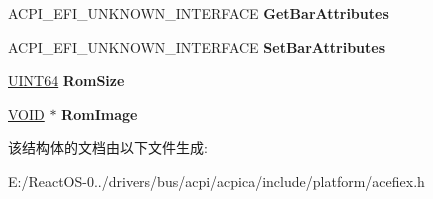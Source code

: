 \begin{DoxyCompactItemize}
A\+C\+P\+I\+\_\+\+E\+F\+I\+\_\+\+U\+N\+K\+N\+O\+W\+N\+\_\+\+I\+N\+T\+E\+R\+F\+A\+CE {\bfseries Get\+Bar\+Attributes}
\item 
\mbox{\label{struct___a_c_p_i___e_f_i___p_c_i___i_o_aa460ced7da34ada58f87001ed3e834d2}} 
A\+C\+P\+I\+\_\+\+E\+F\+I\+\_\+\+U\+N\+K\+N\+O\+W\+N\+\_\+\+I\+N\+T\+E\+R\+F\+A\+CE {\bfseries Set\+Bar\+Attributes}
\item 
\mbox{\label{struct___a_c_p_i___e_f_i___p_c_i___i_o_aa56a07c3a65ca96e4116108529f0ddb9}} 
\hyperlink{_processor_bind_8h_a57be03562867144161c1bfee95ca8f7c}{U\+I\+N\+T64} {\bfseries Rom\+Size}
\item 
\mbox{\label{struct___a_c_p_i___e_f_i___p_c_i___i_o_a1dc0cfd2e73506f5e5153c00256f4792}} 
\hyperlink{interfacevoid}{V\+O\+ID} $\ast$ {\bfseries Rom\+Image}
\end{DoxyCompactItemize}


该结构体的文档由以下文件生成\+:\begin{DoxyCompactItemize}
\item 
E\+:/\+React\+O\+S-\/0../drivers/bus/acpi/acpica/include/platform/acefiex.\+h\end{DoxyCompactItemize}
